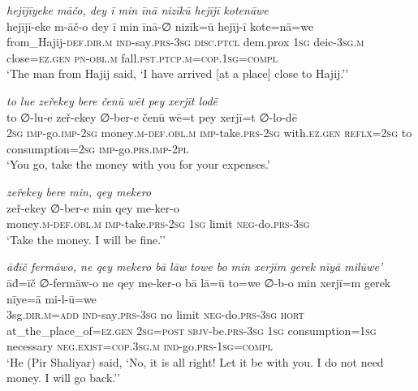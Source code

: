 \ea \label{ŽP.102}
\textit{hejījīyeke māčo, dey ī min īnā nizīkū hejījī kotenāwe} \\ 
\gll hejījī-eke m-āč-o dey ī min īnā-∅ nizīk=ū hejīj-ī kote=nā=we \\ 
 from\_Hajij\textsc{-def}\textsc{.dir}\textsc{.m} \textsc{ind-}say\textsc{.prs}\textsc{-3sg} \textsc{disc.ptcl} dem.prox \textsc{1sg} deic\textsc{-3sg}\textsc{.m} close\textsc{\textsc{=ez.gen}} \textsc{pn}\textsc{-obl}\textsc{.m} fall\textsc{.pst}\textsc{.ptcp}\textsc{.m}\textsc{=cop}\textsc{.\textsc{1sg}}\textsc{=compl} \\ 
\glt `The man from Hajij said, ‘I have arrived [at a place] close to Hajij.’'
\z 
 
\ea \label{ŽP.103}
\textit{to lue zeřekey bere čenū wēt pey xerjīt lodē} \\ 
\gll to ∅-lu-e zeř-ekey ∅-ber-e čenū wē=t pey xerjī=t ∅-lo-dē \\ 
 \textsc{2sg} \textsc{imp-}go.\textsc{imp-}\textsc{2sg} money\textsc{.m}\textsc{-def}\textsc{.obl}\textsc{.m} \textsc{imp-}take\textsc{.prs}-\textsc{2sg} with\textsc{.ez.gen} \textsc{reflx}\textsc{=\textsc{2sg}} to consumption\textsc{=\textsc{2sg}} \textsc{imp-}go\textsc{.prs}.\textsc{imp-}\textsc{2pl} \\ 
\glt `You go, take the money with you for your expenses.'
\z 
 
\ea \label{ŽP.104}
\textit{zeřekey bere min, qey mekero} \\ 
\gll zeř-ekey ∅-ber-e min qey me-ker-o \\ 
 money\textsc{.m}\textsc{-def}\textsc{.obl}\textsc{.m} \textsc{imp-}take\textsc{.prs}-\textsc{2sg} \textsc{1sg} limit \textsc{neg-}do\textsc{.prs}\textsc{-3sg} \\ 
\glt `Take the money. I will be fine.’'
\z 
 
\ea \label{ŽP.105}
\textit{āđīč fermāwo, ne qey mekero bā lāw towe bo min xerjīm gerek nīyā milūwe’} \\ 
\gll āđ=īč ∅-fermāw-o ne qey me-ker-o bā lā=ū to=we ∅-b-o min xerjī=m gerek nīye=ā mi-l-ū=we \\ 
 3sg\textsc{.dir}\textsc{.m}\textsc{=add} \textsc{ind-}say\textsc{.prs}\textsc{-3sg} no limit \textsc{neg-}do\textsc{.prs}\textsc{-3sg} \textsc{hort} at\_the\_place\_of\textsc{\textsc{=ez.gen}} \textsc{2sg}\textsc{=\textsc{post}} \textsc{sbjv-}be\textsc{.prs}\textsc{-3sg} \textsc{1sg} consumption\textsc{=\textsc{1sg}} necessary \textsc{\textsc{neg.}exist}\textsc{=cop}\textsc{.3sg}\textsc{.m} \textsc{ind-}go\textsc{.prs}\textsc{-\textsc{1sg}}\textsc{=compl} \\ 
\glt `He (Pir Shaliyar) said, ‘No, it is all right! Let it be with you. I do not need money. I will go back.’'
\z 
 
